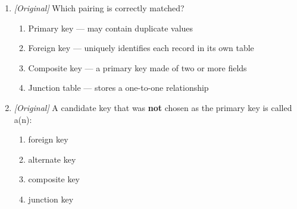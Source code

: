 \documentclass[11pt]{article}
\begin{document}
\begin{enumerate}[label=\textbf{Q\arabic*.}, leftmargin=*]
\begin{enumerate}[label=\Alph*.]
    \item \texttt{.accdb} is the newer format.
    \item \texttt{.mdb} is the newer format introduced with Access 2007.
    \item \texttt{.accdb} supports attachment and multi-valued fields.
  \end{enumerate}
\item \textit{[Original]} Which pairing is correctly matched?
  \begin{enumerate}[label=\Alph*.]
    \item Primary key --- may contain duplicate values
    \item Foreign key --- uniquely identifies each record in its own table
    \item Composite key --- a primary key made of two or more fields
    \item Junction table --- stores a one-to-one relationship
  \end{enumerate}
\item \textit{[Original]} A candidate key that was \textbf{not} chosen as the
  primary key is called a(n):
  \begin{enumerate}[label=\Alph*.]
    \item foreign key
    \item alternate key
    \item composite key
    \item junction key
  \end{enumerate}


\end{enumerate}
\end{document}
